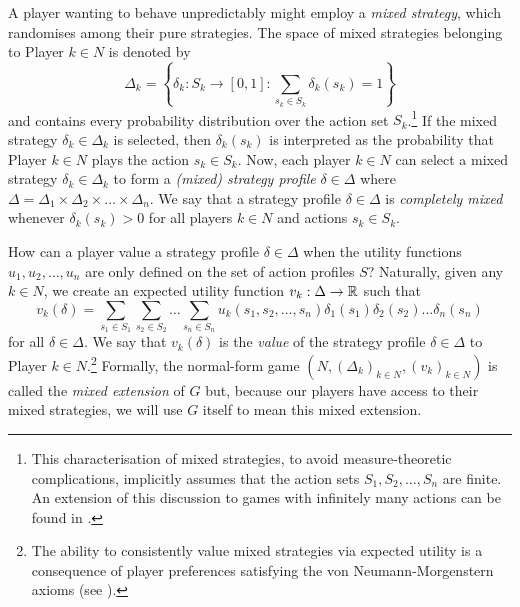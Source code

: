     A player wanting to behave unpredictably might employ a \emph{mixed strategy}, which randomises among their pure strategies.
    The space of mixed strategies belonging to Player $k \in N$ is denoted by
    \[
        \Delta_k
            =
            \left\{
                \delta_k : S_k \to [0, 1] : \sum_{s_k \in S_k} \delta_k(s_k) = 1
            \right\}
    \]
    and contains every probability distribution over the action set $S_k$.\footnote{
        This characterisation of mixed strategies, to avoid measure-theoretic complications, implicitly assumes that the action sets $S_1, S_2, \ldots, S_n$ are finite.
        An extension of this discussion to games with infinitely many actions can be found in \parencite[Chapter 4]{Owen2013}.
    }
    If the mixed strategy $\delta_k \in \Delta_k$ is selected, then $\delta_k(s_k)$ is interpreted as the probability that Player $k \in N$ plays the action $s_k \in S_k$.
    Now, each player $k \in N$ can select a mixed strategy $\delta_k \in \Delta_k$ to form a \emph{(mixed) strategy profile} $\delta \in \Delta$ where $\Delta = \Delta_1 \times \Delta_2 \times \ldots \times \Delta_n$.
    We say that a strategy profile $\delta \in \Delta$ is \emph{completely mixed} whenever $\delta_k(s_k) > 0$ for all players $k \in N$ and actions $s_k \in S_k$.

    How can a player value a strategy profile $\delta \in \Delta$ when the utility functions $u_1, u_2, \ldots, u_n$ are only defined on the set of action profiles $S$?
    Naturally, given any $k \in N$, we create an expected utility function $v_k : \Delta \to \mathbb{R}$ such that
    \begin{equation} \label{eq:expected-utility}
        v_k(\delta)
            = \sum_{s_1 \in S_1} \sum_{s_2 \in S_2} \ldots \sum_{s_n \in S_n} u_k(s_1, s_2, \ldots, s_n) \delta_1(s_1) \delta_2(s_2) \ldots \delta_n(s_n)
    \end{equation}
    for all $\delta \in \Delta$.
    We say that $v_k(\delta)$ is the \emph{value} of the strategy profile $\delta \in \Delta$ to Player $k \in N$.\footnote{The
        ability to consistently value mixed strategies via expected utility is a consequence of player preferences satisfying the von Neumann-Morgenstern axioms (see \parencite[Theorem 2.18]{Maschler2013}).
    }
    Formally, the normal-form game $(N, (\Delta_k)_{k \in N}, (v_k)_{k \in N})$ is called the \emph{mixed extension} of $G$ but, because our players have access to their mixed strategies, we will use $G$ itself to mean this mixed extension.

